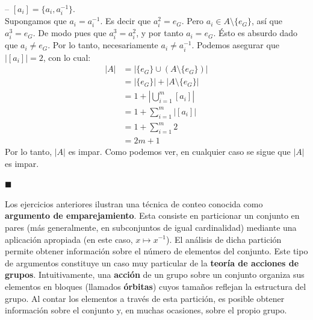 \documentclass[10 pt]{article}
\begin{document}
\begin{itemize}
{    -- $[a_i]=\{a_i,a_i^{-1}\}$. \\

    Supongamos que $a_i=a_i^{-1}$. Es decir que $a_i^2=e_G$. Pero $a_i \in A \setminus \{e_G\}$, así que $a_i^3=e_G$. De modo pues que $a_i^3=a_i^2$, y por tanto $a_i=e_G$. Ésto es absurdo dado que $a_i \neq e_G$. Por lo tanto, necesariamente $a_i \neq a_i^{-1}$. Podemos asegurar que $|[a_i]|=2$, con lo cual:}
    \begin{align*}
        |A|&=\left|\{e_G\} \cup (A \setminus \{e_G\}) \right| \\
        &=|\{e_G\}|+|A \setminus \{e_G\}| \\
        &=1+\left |\bigcup_{i=1}^m[a_i] \right| \\
        &=1+\sum_{i=1}^m|[a_i]| \\
        &=1+\sum_{i=1}^m2 \\
        &=2m+1
    \end{align*}
    \Large{Por lo tanto, $|A|$ es impar. Como podemos ver, en cualquier caso se sigue que $|A|$ es impar.} \\
\end{itemize}

\begin{flushright}
    $\blacksquare$
\end{flushright}

\Large{Los ejercicios anteriores ilustran una técnica de conteo conocida como \textbf{argumento de emparejamiento}. Esta consiste en particionar un conjunto en pares (más generalmente, en subconjuntos de igual cardinalidad) mediante una aplicación apropiada (en este caso, $x \mapsto x^{-1}$). El análisis de dicha partición permite obtener información sobre el número de elementos del conjunto. Este tipo de argumentos constituye un caso muy particular de la \textbf{teoría de acciones de grupos}. Intuitivamente, una \textbf{acción} de un grupo sobre un conjunto organiza sus elementos en bloques (llamados \textbf{órbitas}) cuyos tamaños reflejan la estructura del grupo. Al contar los elementos a través de esta partición, es posible obtener información sobre el conjunto y, en muchas ocasiones, sobre el propio grupo.}
\end{document}
